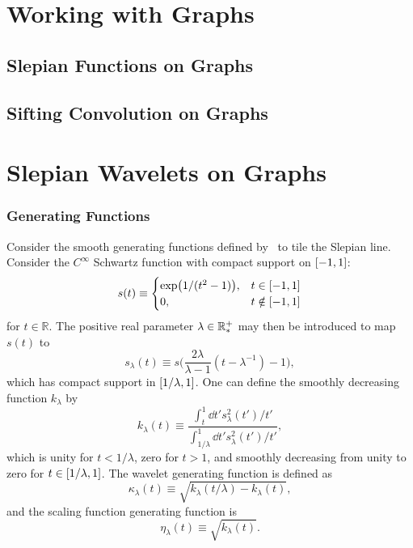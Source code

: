 \section{Working with Graphs}

\subsection{Slepian Functions on Graphs}







\subsection{Sifting Convolution on Graphs}

\section{Slepian Wavelets on Graphs}

\subsubsection{Generating Functions}

Consider the smooth generating functions defined by~\cite{Wiaux2008} to tile the Slepian line.
Consider the \(C^{\infty}\) Schwartz function with compact support on \(\interval{-1}{1}\):
%
\begin{equation}
	s(t) \equiv
	\begin{cases}
		\exp(1/(t^{2}-1)), & t \in \interval{-1}{1}    \\
		0,                 & t \notin \interval{-1}{1}
	\end{cases}
\end{equation}
%
for \(t \in \mathbb{R}\).
The positive real parameter \(\lambda \in \mathbb{R}_{\ast}^{+}{}\) may then be introduced to map \(s(t)\) to
%
\begin{equation}
	s_{\lambda}(t)
	\equiv s\bigg(\frac{2\lambda}{\lambda-1}(t-\lambda^{-1}) - 1\bigg),
\end{equation}
%
which has compact support in \(\interval{1/\lambda}{1}\).
One can define the smoothly decreasing function \(k_{\lambda}\) by
%
\begin{equation}
	k_{\lambda}(t)
	\equiv \frac{\int_{t}^{1} \dd{t'} s^{2}_{\lambda}(t')/t'}
	{\int_{1/\lambda}^{1} \dd{t'} s^{2}_{\lambda}(t')/t'},
\end{equation}
%
which is unity for \(t < 1/\lambda{}\), zero for \(t > 1\), and smoothly decreasing from unity to zero for \(t \in \interval{1/\lambda}{1}\).
The wavelet generating function is defined as
%
\begin{equation}
	\kappa_{\lambda}(t)
	\equiv \sqrt{k_{\lambda}(t/\lambda) - k_{\lambda}(t)},
\end{equation}
%
and the scaling function generating function is
%
\begin{equation}
	\eta_{\lambda}(t)
	\equiv \sqrt{k_{\lambda}(t)}.
\end{equation}

